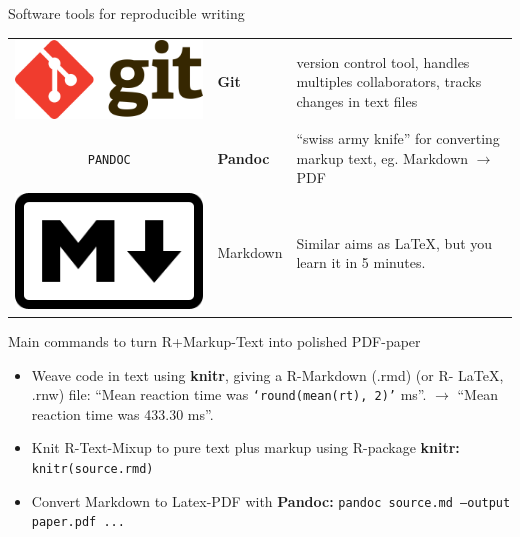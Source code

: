 \documentclass[final,hyperref={pdfpagelabels=false}]{beamer}
\begin{document}
\begin{frame}{}
\begin{columns}[t]
\begin{column}{.48\linewidth}
\begin{block}{Software tools for reproducible writing}
\begin{tabulary}{1.0\textwidth}{CLL}
 \includegraphics[valign=T, scale=.3]{logo/git_logo} & \textbf{Git} & version control tool, handles multiples collaborators, tracks changes in text files\\
 \texttt{PANDOC} &  \textbf{Pandoc} & ``swiss army knife'' for converting markup text, eg. Markdown $\rightarrow$ PDF\\
 \includegraphics[valign=T, scale=.5]{logo/markdown_logo} & Markdown & Similar aims as \LaTeX, but you learn it in 5 minutes.\\  
  \end{tabulary}
  
   \end{block}



        \begin{block}{Main commands to turn R+Markup-Text into polished PDF-paper}
        
       
          \begin{itemize}
             \item Weave code in text using \textbf{knitr}, giving a R-Markdown (.rmd) (or R- \LaTeX, .rnw) file: ``Mean reaction time was \texttt{`round(mean(rt), 2)'} ms''. $\rightarrow$ ``Mean reaction time was 433.30 ms''.
             \item Knit R-Text-Mixup to pure text plus markup using R-package \textbf{knitr:}
             \newline \texttt{knitr(source.rmd)} 
             \item Convert Markdown to Latex-PDF with \textbf{Pandoc:} 
             \newline \texttt{pandoc source.md --output paper.pdf ...} 
      \end{itemize}
          

\end{block}
\end{column}
\end{columns}
\end{frame}
\end{document}
